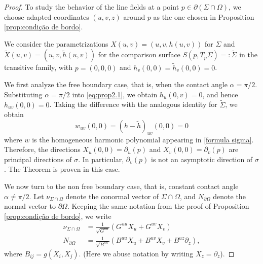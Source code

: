 \documentclass[10pt,a4paper]{amsart}
\begin{document}
\begin{proof} To study the behavior of the line fields at a point $p\in \partial (\Sigma\cap\Omega)$, we choose adapted coordinates $(u,v,z)$ around $p$ as the one chosen in Proposition \ref{prop:condição de bordo}.


We consider the parametrizations $X(u,v)=(u,v,h(u,v))$ for $\Sigma$ and $\widetilde{X}(u,v)=(u,v,\widetilde{h}(u,v))$ for the comparison surface $S(p,T_p\Sigma)=:\widetilde{\Sigma}$ in the transitive family, with $p=(0,0,0)$ and $h_v(0,0)=\widetilde{h}_v(0,0)=0$.

We first analyze the free boundary case, that is, when the contact angle $\alpha=\pi/2$. Substituting $\alpha=\pi/2$ into \eqref{eq:prop2.1}, we obtain $h_u(0,v)=0$, and hence $h_{uv}(0,0)=0$. %
Taking the difference with the analogous identity for $\widetilde{\Sigma}$, we obtain
\begin{equation*}
    w_{uv}(0,0)=(h-\widetilde{h})_{uv}(0,0)=0
\end{equation*}
where $w$ is the homogeneous harmonic polynomial appearing in \eqref{formula sigma}. Therefore, the directions $X_u(0,0)=\partial_u(p)$ and $X_v(0,0)=\partial_v(p)$ are principal directions of $\sigma$. In particular, $\partial_v(p)$ is not an asymptotic direction of $\sigma$.  The Theorem is proven in this case.

We now turn to the non free boundary case, that is, constant contact angle $\alpha\neq \pi/2$. Let $\nu_{\Sigma\cap \Omega}$ denote the conormal vector of $\Sigma\cap\Omega$, and $N_{\partial\Omega}$ denote the normal vector to $\partial\Omega$. Keeping the same notation from the proof of Proposition \ref{prop:condição de bordo}, we write
    \begin{align*}
        \nu_{\Sigma\cap \Omega}& =\frac{1}{\sqrt{G^{uu}}}(G^{uu}X_u+G^{uv}X_v) \\
        N_{\partial \Omega}& =\frac{1}{\sqrt{B^{uu}}}(B^{uu}X_u+B^{uv}X_v+B^{uz}\partial_z),
    \end{align*}
where $B_{ij}=g(X_i,X_j)$. (Here we abuse notation by writing $X_z=\partial_z$).


\end{proof}
\end{document}
